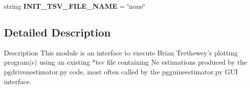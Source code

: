 \begin{DoxyCompactItemize}
\item 
string {\bfseries I\+N\+I\+T\+\_\+\+T\+S\+V\+\_\+\+F\+I\+L\+E\+\_\+\+N\+A\+ME} = \char`\"{}none\char`\"{}\hypertarget{namespacenegui_1_1pgguiviz_a12dafc94cb351a199fd44f90c7f67344}{}\label{namespacenegui_1_1pgguiviz_a12dafc94cb351a199fd44f90c7f67344}

\end{DoxyCompactItemize}


\subsection{Detailed Description}
\begin{DoxyVerb}Description
This module is an interface to execute Brian Trethewey's plotting
program(s) using an existing *tsv file containing Ne estimations
produced by the pgdrivenestimator.py code,
most often called by the pgguineestimator.py GUI interface.
\end{DoxyVerb}
 